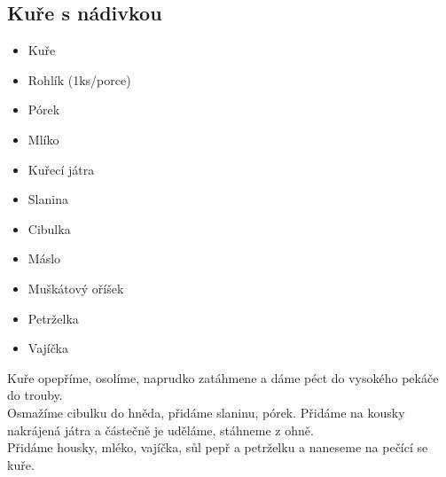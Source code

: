 \documentclass[10pt,a4paper]{article}
\newenvironment{myitemize}
{ \begin{itemize}
    \setlength{\itemsep}{0pt}
    \setlength{\parskip}{0pt}
    \setlength{\parsep}{0pt}     }
{ \end{itemize}                  }
\begin{document}
\subsection{Kuře s nádivkou}
\begin{minipage}[t]{0,5\textwidth}
\begin{myitemize} 
\item Kuře
\item Rohlík (1ks/porce)
\item Pórek
\item Mlíko
\item Kuřecí játra
\item Slanina
\item Cibulka
\item Máslo
\item Muškátový oříšek
\item Petrželka
\item Vajíčka
\end{myitemize}
\end{minipage}
\begin{minipage}[t]{0,5\textwidth}
Kuře opepříme, osolíme, naprudko zatáhmene a dáme péct do vysokého pekáče do trouby.\\
Osmažíme cibulku do hněda, přidáme slaninu, pórek. Přidáme na kousky nakrájená játra a částečně je uděláme, stáhneme z ohně.\\
Přidáme housky, mléko, vajíčka, sůl pepř a petrželku a naneseme na pečící se kuře.
\end{minipage}
\end{document}
